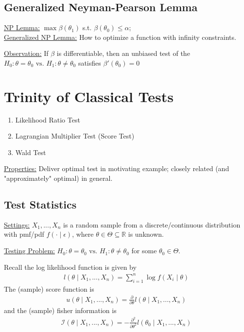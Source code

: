 \documentclass[11pt]{elegantbook}
\begin{document}
\subsection{Generalized Neyman-Pearson Lemma}
\underline{NP Lemma:} $\max\beta(\theta_1)$ s.t. $\beta(\theta_0)\leq \alpha$;\\
\underline{Generalized NP Lemma:} How to optimize a function with infinity constraints.

\underline{Observation:} If $\beta$ is differentiable, then an unbiased test of the $H_0:\theta=\theta_0 \text{ vs. }H_1:\theta\neq \theta_0$ satisfies $\beta'(\theta_0)=0$
\begin{theorem}
    \normalfont
\end{theorem}


\section{Trinity of Classical Tests}
\begin{enumerate}[$\circ$]
    \item Likelihood Ratio Test
    \item Lagrangian Multiplier Test (Score Test)
    \item Wald Test
\end{enumerate}
\underline{Properties:} Deliver optimal test in motivating example; closely related (and "approximately" optimal) in general.

\subsection{Test Statistics}
\underline{Settings:} $X_1,...,X_n$ is a random sample from a discrete/continuous distribution with pmf/pdf $f(\cdot\mid\epsilon)$, where $\theta\in\Theta\subseteq \mathbb{R}$ is unknown.

\underline{Testing Problem:} $H_0:\theta=\theta_0 \text{ vs. }H_1:\theta\neq \theta_0$ for some $\theta_0\in\Theta$.

Recall the log likelihood function is given by
\begin{equation}
    \begin{aligned}
        l(\theta\mid X_1,...,X_n)=\sum_{i=1}^n \log f(X_i\mid \theta)
    \end{aligned}
    \nonumber
\end{equation}
The (sample) score function is
\begin{equation}
    \begin{aligned}
        u(\theta\mid X_1,...,X_n)=\frac{\partial}{\partial \theta}l(\theta\mid X_1,...,X_n)
    \end{aligned}
    \nonumber
\end{equation}
and the (sample) fisher information is
\begin{equation}
    \begin{aligned}
        \mathcal{I}(\theta\mid X_1,...,X_n)=-\frac{\partial^2}{\partial \theta^2}l(\theta_0\mid X_1,...,X_n)
    \end{aligned}
    \nonumber
\end{equation}
\end{document}
